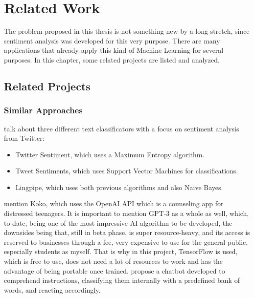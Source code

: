 \chapter{Related Work}
The problem proposed in this thesis is not something new by a long stretch, since sentiment analysis was developed for this very purpose. There are many applications that already apply this kind of Machine Learning for several purposes. In this chapter, some related projects are listed and analyzed.

\section{Related Projects}
\subsection{Similar Approaches}
\citet{rf10} talk about three different text classificators with a focus on sentiment analysis from Twitter: 
\begin{itemize}
\item Twitter Sentiment, which uses a Maximum Entropy algorithm.
\item Tweet Sentiments, which uses Support Vector Machines for classifications.
\item Lingpipe, which uses both previous algorithms and also Naive Bayes.
\end{itemize}
\citet{rf6} mention Koko, which uses the OpenAI API which is a counseling app for distressed teenagers. It is important to mention GPT-3 as a whole as well, which, to date, being one of the most impressive AI algorithm to be developed, the downsides being that, still in beta phase, is super resource-heavy, and its access is reserved to businesses through a fee, very expensive to use for the general public, especially students as myself. That is why in this project, TensorFlow is used, which is free to use, does not need a lot of resources to work and has the advantage of being portable once trained.
\citet{rf14} propose a chatbot developed to comprehend instructions, classifying them internally with a predefined bank of words, and reacting accordingly.

